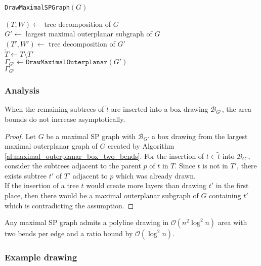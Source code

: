 \begin{algorithm}[H]
	\caption{\texttt{DrawMaximalSPGraph}$(G)$}
	$(T,W) \gets$ tree decomposition of $G$\\
	$G' \gets$ largest maximal outerplanar subgraph of $G$\\
	$(T',W') \gets$ tree decomposition of $G'$\\
	$\tilde{T} \gets T\setminus T'$\\
	$\Gamma_{G'} \gets \texttt{DrawMaximalOuterplanar}(G')$\\
	\Return $\Gamma_{G'}$
\end{algorithm}

\subsubsection{Analysis}

\begin{lemma}
	When the remaining subtrees of $\tilde{t}$ are inserted into a box drawing $\mathcal{B}_{G'}$, the area bounds do not increase asymptotically.
\end{lemma}
\begin{proof}
	Let $G$ be a maximal SP graph with $\mathcal{B}_{G'}$ a box drawing from the largest maximal outerplanar graph of $G$ created by Algorithm \ref{al:maximal_outerplanar_box_two_bends}. For the insertion of $t\in \tilde{t}$ into $\mathcal{B}_{G'}$, consider the subtrees adjacent to the parent $p$ of $t$ in $T$. Since $t$ is not in $T'$, there exists subtree $t'$ of $T'$ adjacent to $p$ which was already drawn.\\
	If the insertion of a tree $t$ would create more layers than drawing $t'$ in the first place, then there would be a maximal outerplanar subgraph of $G$ containing $t'$ which is contradicting the assumption.
\end{proof}


\begin{theorem}
	Any maximal SP graph admits a polyline drawing in $\mathcal{O}(n^2 \log^2 n)$ area with two bends per edge and a ratio bound by $\mathcal{O}(\log^2 n)$.
\end{theorem}

\subsubsection{Example drawing}
